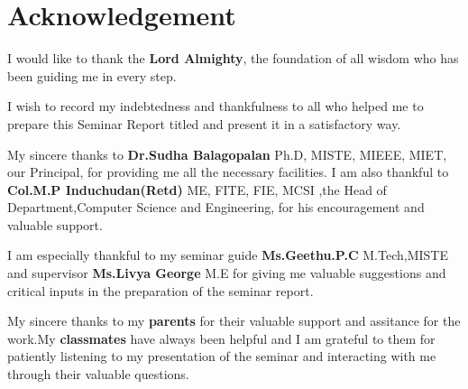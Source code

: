 \chapter*{Acknowledgement}
%
I would like to thank the {\bf Lord Almighty}, the foundation of all wisdom who has been guiding me in every step. 

I wish to record my indebtedness and thankfulness to all who helped me to prepare this Seminar Report titled {\bf \vtitle } and present it in a satisfactory way. 


My sincere thanks to {\bf Dr.Sudha Balagopalan} Ph.D, MISTE, MIEEE, MIET, our Principal, for providing me all the necessary facilities.
I am also thankful to {\bf Col.M.P Induchudan(Retd)} ME, FITE, FIE, MCSI ,the Head of Department,Computer Science and Engineering,
for his encouragement and valuable 
support.

I am especially thankful to my seminar guide {\bf  Ms.Geethu.P.C} M.Tech,MISTE and supervisor {\bf Ms.Livya George} M.E
for giving me valuable suggestions and 
critical inputs in the preparation of the seminar report. 

My sincere thanks to my {\bf parents} for their valuable support and assitance for the work.My {\bf classmates} have always been 
helpful and I am grateful to them for 
patiently listening to  my presentation of the seminar and interacting with me through their valuable questions. 